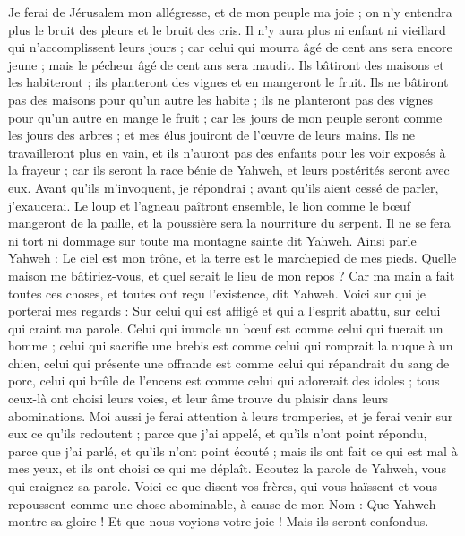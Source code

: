 \begin{multicols}{2}
Je ferai de Jérusalem mon allégresse, et de mon peuple ma joie ; on n'y entendra plus le bruit des pleurs et le bruit des cris.
Il n'y aura plus ni enfant ni vieillard qui n'accomplissent leurs jours ; car celui qui mourra âgé de cent ans sera encore jeune ; mais le pécheur âgé de cent ans sera maudit.
Ils bâtiront des maisons et les habiteront ; ils planteront des vignes et en mangeront le fruit.
Ils ne bâtiront pas des maisons pour qu'un autre les habite ; ils ne planteront pas des vignes pour qu'un autre en mange le fruit ; car les jours de mon peuple seront comme les jours des arbres ; et mes élus jouiront de l'œuvre de leurs mains.
Ils ne travailleront plus en vain, et ils n'auront pas des enfants pour les voir exposés à la frayeur ; car ils seront la race bénie de Yahweh, et leurs postérités seront avec eux.
Avant qu'ils m'invoquent, je répondrai ; avant qu'ils aient cessé de parler, j'exaucerai.
Le loup et l'agneau paîtront ensemble, le lion comme le bœuf mangeront de la paille, et la poussière sera la nourriture du serpent. Il ne se fera ni tort ni dommage sur toute ma montagne sainte dit Yahweh.
\VerseOne{}Ainsi parle Yahweh : Le ciel est mon trône, et la terre est le marchepied de mes pieds. Quelle maison me bâtiriez-vous, et quel serait le lieu de mon repos ?
Car ma main a fait toutes ces choses, et toutes ont reçu l'existence, dit Yahweh. Voici sur qui je porterai mes regards : Sur celui qui est affligé et qui a l'esprit abattu, sur celui qui craint ma parole.
Celui qui immole un bœuf est comme celui qui tuerait un homme ; celui qui sacrifie une brebis est comme celui qui romprait la nuque à un chien, celui qui présente une offrande est comme celui qui répandrait du sang de porc, celui qui brûle de l'encens est comme celui qui adorerait des idoles ; tous ceux-là ont choisi leurs voies, et leur âme trouve du plaisir dans leurs abominations.
Moi aussi je ferai attention à leurs tromperies, et je ferai venir sur eux ce qu'ils redoutent ; parce que j'ai appelé, et qu'ils n'ont point répondu, parce que j'ai parlé, et qu'ils n'ont point écouté ; mais ils ont fait ce qui est mal à mes yeux, et ils ont choisi ce qui me déplaît.
Ecoutez la parole de Yahweh, vous qui craignez sa parole. Voici ce que disent vos frères, qui vous haïssent et vous repoussent comme une chose abominable, à cause de mon Nom : Que Yahweh montre sa gloire ! Et que nous voyions votre joie ! Mais ils seront confondus.

\end{multicols}
